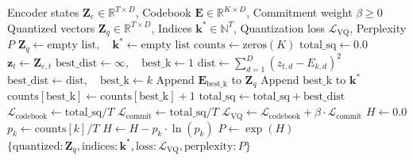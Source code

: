 \documentclass[11pt,a4paper]{article}
\theoremstyle{definition}
\begin{document}
\begin{algorithm}[H]
\caption{Vector Quantization Forward Pass and Perplexity Metric}
\label{alg:vqvae}
\begin{algorithmic}[1]
\Require Encoder states $\mathbf{Z}_e \in \mathbb{R}^{T \times D}$, Codebook $\mathbf{E} \in \mathbb{R}^{K \times D}$, Commitment weight $\beta \ge 0$
\Ensure Quantized vectors $\mathbf{Z}_q \in \mathbb{R}^{T \times D}$, Indices $\mathbf{k}^* \in \mathbb{N}^T$, Quantization loss $\mathcal{L}_{\text{VQ}}$, Perplexity $P$
\State $\mathbf{Z}_q \gets \text{empty list}, \quad \mathbf{k}^* \gets \text{empty list}$
\State $\text{counts} \gets \text{zeros}(K)$
\State $\text{total\_sq} \gets 0.0$
    \State $\mathbf{z}_t \gets \mathbf{Z}_{e, t}$
    \State $\text{best\_dist} \gets \infty, \quad \text{best\_k} \gets 1$
        \State $\text{dist} \gets \sum_{d=1}^D (z_{t, d} - E_{k, d})^2$
            \State $\text{best\_dist} \gets \text{dist}, \quad \text{best\_k} \gets k$
        \EndIf
    \EndFor
    \State Append $\mathbf{E}_{\text{best\_k}}$ to $\mathbf{Z}_q$
    \State Append $\text{best\_k}$ to $\mathbf{k}^*$
    \State $\text{counts}[\text{best\_k}] \gets \text{counts}[\text{best\_k}] + 1$
    \State $\text{total\_sq} \gets \text{total\_sq} + \text{best\_dist}$
\EndFor
\State $\mathcal{L}_{\text{codebook}} \gets \text{total\_sq} / T$
\State $\mathcal{L}_{\text{commit}} \gets \text{total\_sq} / T$
\State $\mathcal{L}_{\text{VQ}} \gets \mathcal{L}_{\text{codebook}} + \beta \cdot \mathcal{L}_{\text{commit}}$
\State $H \gets 0.0$
        \State $p_k \gets \text{counts}[k] / T$
        \State $H \gets H - p_k \cdot \ln(p_k)$
    \EndIf
\EndFor
\State $P \gets \exp(H)$
\State \Return $\{\text{quantized}: \mathbf{Z}_q, \text{indices}: \mathbf{k}^*, \text{loss}: \mathcal{L}_{\text{VQ}}, \text{perplexity}: P\}$
\end{algorithmic}
\end{algorithm}
\end{document}
